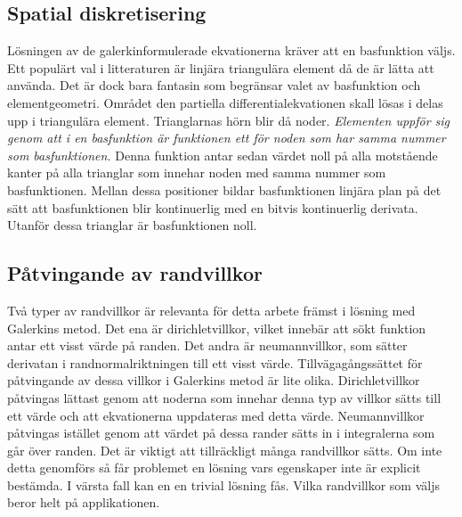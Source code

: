 \subsection{Spatial diskretisering}

Lösningen av de galerkinformulerade ekvationerna kräver att en basfunktion väljs.
Ett populärt val i litteraturen är linjära triangulära element då de
är lätta att använda. Det är dock bara fantasin som begränsar valet av basfunktion
och elementgeometri.
\cite{johnson2009}\cite{lewis04}\cite{reddy93}\cite{fem50} Området den
partiella differentialekvationen skall lösas i delas upp i triangulära element.
Trianglarnas hörn blir då noder. \emph{\color{red} Elementen uppför sig genom att i en basfunktion
är funktionen ett för noden som har samma nummer som basfunktionen.} Denna funktion
antar sedan värdet noll på alla motstående kanter på alla trianglar som innehar noden
med samma nummer som basfunktionen. Mellan dessa positioner bildar basfunktionen
linjära plan på det sätt att basfunktionen blir kontinuerlig med en bitvis
kontinuerlig derivata.
Utanför dessa trianglar är basfunktionen noll. \cite{johnson2009}

\subsection{Påtvingande av randvillkor}
\label{subsec:boundaryenforcement}
Två typer av randvillkor är relevanta för detta arbete främst i lösning med Galerkins 
metod. Det ena är dirichletvillkor, vilket
innebär att sökt funktion antar ett visst värde på randen. Det andra är neumannvillkor,
som sätter derivatan i randnormalriktningen till ett visst värde. Tillvägagångssättet
för påtvingande av dessa villkor i Galerkins metod är lite olika. Dirichletvillkor
påtvingas lättast genom att noderna som innehar denna typ av villkor sätts till ett värde
och att ekvationerna uppdateras med detta värde. Neumannvillkor påtvingas istället
genom att värdet på dessa rander sätts in i integralerna som går över randen. Det
är viktigt att tillräckligt många randvillkor sätts. Om inte detta genomförs
så får problemet en lösning vars egenskaper inte är explicit bestämda. I värsta fall kan en en trivial lösning fås. Vilka randvillkor som väljs beror helt
på applikationen.
